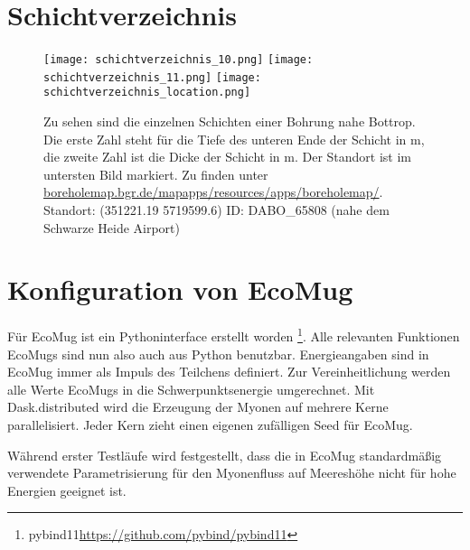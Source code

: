 \section{Schichtverzeichnis}
\label{sec:alle_schichten}
\begin{figure}
    \centering
    \texttt{[image: schichtverzeichnis\_10.png]}
    \texttt{[image: schichtverzeichnis\_11.png]}
    \texttt{[image: schichtverzeichnis\_location.png]}
    \caption{Zu sehen sind die einzelnen Schichten einer Bohrung nahe
     Bottrop. Die erste Zahl steht für die Tiefe des unteren Ende der Schicht in \si[]{m}, die zweite 
    Zahl ist die Dicke der Schicht in \si[]{m}. Der Standort ist im untersten Bild markiert. Zu finden unter 
    \url{boreholemap.bgr.de/mapapps/resources/apps/boreholemap/}. 
    Standort: (\num[]{351221,19} \num[]{5719599,6}) 
    ID: DABO\_65808 (nahe dem Schwarze Heide Airport)}
    \label{fig:Schichtverzeichnis_komplett}
\end{figure}





\section{Konfiguration von EcoMug}
Für EcoMug ist ein Pythoninterface erstellt worden
\footnote{pybind11\url{https://github.com/pybind/pybind11}}. Alle relevanten Funktionen EcoMugs sind nun also auch aus Python benutzbar.
Energieangaben sind in EcoMug immer als Impuls des Teilchens definiert. Zur Vereinheitlichung werden alle
Werte EcoMugs in die Schwerpunktsenergie umgerechnet. 
Mit Dask.distributed wird die Erzeugung der Myonen auf
mehrere Kerne parallelisiert. Jeder Kern zieht einen eigenen zufälligen Seed für EcoMug.

Während erster Testläufe wird festgestellt, dass die in EcoMug standardmäßig verwendete 
Parametrisierung für den Myonenfluss auf Meereshöhe nicht für hohe Energien geeignet ist.





